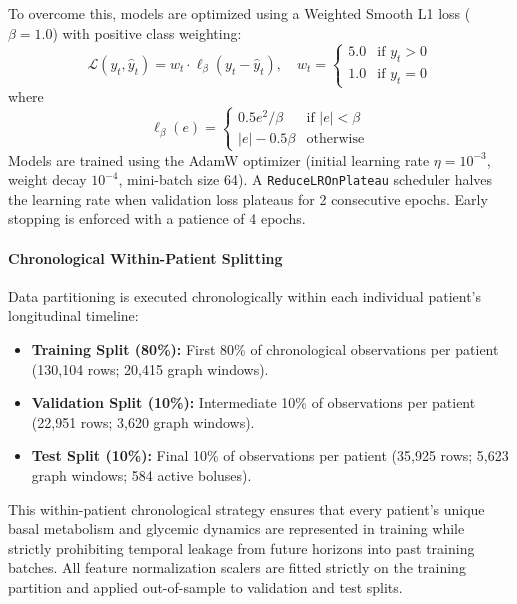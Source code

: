 \documentclass[10pt,a4paper]{article}
\begin{document}
To overcome this, models are optimized using a Weighted Smooth L1 loss ($\beta = 1.0$) with positive class weighting:
\begin{equation}
\mathcal{L}(y_t, \hat{y}_t) = w_t \cdot \ell_{\beta}(y_t - \hat{y}_t), \quad w_t = \begin{cases} 5.0 & \text{if } y_t > 0 \\ 1.0 & \text{if } y_t = 0 \end{cases}
\end{equation}
where
\begin{equation}
\ell_{\beta}(e) = \begin{cases} 0.5 e^2 / \beta & \text{if } |e| < \beta \\ |e| - 0.5 \beta & \text{otherwise} \end{cases}
\end{equation}
Models are trained using the AdamW optimizer (initial learning rate $\eta = 10^{-3}$, weight decay $10^{-4}$, mini-batch size 64). A \texttt{ReduceLROnPlateau} scheduler halves the learning rate when validation loss plateaus for 2 consecutive epochs. Early stopping is enforced with a patience of 4 epochs.

\paragraph{Chronological Within-Patient Splitting}
Data partitioning is executed chronologically within each individual patient's longitudinal timeline:
\begin{itemize}
    \item \textbf{Training Split (80\%):} First 80\% of chronological observations per patient (130,104 rows; 20,415 graph windows).
    \item \textbf{Validation Split (10\%):} Intermediate 10\% of observations per patient (22,951 rows; 3,620 graph windows).
    \item \textbf{Test Split (10\%):} Final 10\% of observations per patient (35,925 rows; 5,623 graph windows; 584 active boluses).
\end{itemize}
This within-patient chronological strategy ensures that every patient's unique basal metabolism and glycemic dynamics are represented in training while strictly prohibiting temporal leakage from future horizons into past training batches. All feature normalization scalers are fitted strictly on the training partition and applied out-of-sample to validation and test splits.
\end{document}
